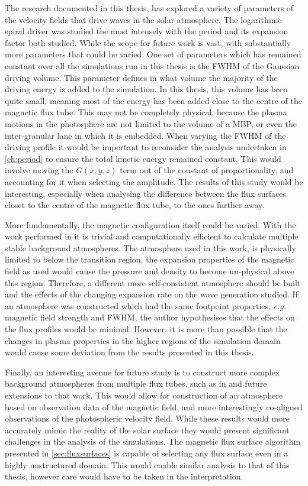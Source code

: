 The research documented in this thesis, has explored a variety of parameters of the velocity fields that drive waves in the solar atmosphere.
The logarithmic spiral driver was studied the most intensely with the period and its expansion factor both studied.
While the scope for future work is vast, with substantially more parameters that could be varied.
One set of parameters which has remained constant over all the simulations run in this thesis is the FWHM of the Gaussian driving volume.
This parameter defines in what volume the majority  of the driving energy is added to the simulation.
In this thesis, this volume has been quite small, meaning most of the energy has been added close to the centre of the magnetic flux tube.
This may not be completely physical, because the plasma motions in the photosphere are not limited to the volume of a MBP, or even the inter-granular lane in which it is embedded.
When varying the FWHM of the driving profile it would be important to reconsider the analysis undertaken in \cref{ch:period} to ensure the total kinetic energy remained constant.
This would involve moving the $G(x,y,z)$ term out of the constant of proportionality, and accounting for it when selecting the amplitude.
The results of this study would be interesting, especially when analysing the difference between the flux surfaces closet to the centre of the magnetic flux tube, to the ones further away.

More fundamentally, the magnetic configuration itself could be varied.
With the work performed in \cite{gent2013,gent2014} it is trivial and computationally efficient to calculate multiple stable background atmospheres.
The atmosphere used in this work, is physically limited to below the transition region, the expansion properties of the magnetic field as used would cause the pressure and density to become un-physical above this region.
Therefore, a different more self-consistent atmosphere should be built and the effects of the changing expansion rate on the wave generation studied.
If an atmosphere was constructed which had the same footpoint properties, \textit{e.g.} magnetic field strength and FWHM, the author hypothesises that the effects on the flux profiles would be minimal.
However, it is more than possible that the changes in plasma properties in the higher regions of the simulation domain would cause some deviation from the results presented in this thesis.

Finally, an interesting avenue for future study is to construct more complex background atmospheres from multiple flux tubes, such as in \cite{gent2014} and future extensions to that work.
This would allow for construction of an atmosphere based on observation data of the magnetic field, and more interestingly co-aligned observations of the photospheric velocity field.
While these results would more accurately mimic the reality of the solar surface they would present significant challenges in the analysis of the simulations.
The magnetic flux surface algorithm presented in \cref{sec:fluxsurfaces} is capable of selecting any flux surface even in a highly unstructured domain.
This would enable similar analysis to that of this thesis, however care would have to be taken in the interpretation.

